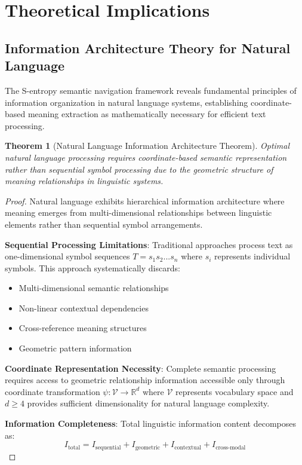 \documentclass[12pt,a4paper]{article}
\newtheorem{theorem}{Theorem}
\begin{document}
\begin{table}[H]
\section{Theoretical Implications}

\subsection{Information Architecture Theory for Natural Language}

The S-entropy semantic navigation framework reveals fundamental principles of information organization in natural language systems, establishing coordinate-based meaning extraction as mathematically necessary for efficient text processing.

\begin{theorem}[Natural Language Information Architecture Theorem]
Optimal natural language processing requires coordinate-based semantic representation rather than sequential symbol processing due to the geometric structure of meaning relationships in linguistic systems.
\end{theorem}

\begin{proof}
Natural language exhibits hierarchical information architecture where meaning emerges from multi-dimensional relationships between linguistic elements rather than sequential symbol arrangements.

\textbf{Sequential Processing Limitations}:
Traditional approaches process text as one-dimensional symbol sequences $T = s_1s_2...s_n$ where $s_i$ represents individual symbols. This approach systematically discards:
\begin{itemize}
\item Multi-dimensional semantic relationships
\item Non-linear contextual dependencies
\item Cross-reference meaning structures
\item Geometric pattern information
\end{itemize}

\textbf{Coordinate Representation Necessity}:
Complete semantic processing requires access to geometric relationship information accessible only through coordinate transformation $\psi: \mathcal{V} \to \mathbb{R}^d$ where $\mathcal{V}$ represents vocabulary space and $d \geq 4$ provides sufficient dimensionality for natural language complexity.

\textbf{Information Completeness}:
Total linguistic information content decomposes as:
\begin{equation}
I_{\text{total}} = I_{\text{sequential}} + I_{\text{geometric}} + I_{\text{contextual}} + I_{\text{cross-modal}}
\end{equation}


\end{proof}
\end{table}
\end{document}

